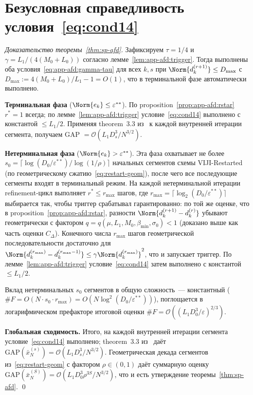 \section{Безусловная справедливость условия~\eqref{eq:cond14}}
\label{sec:app-afd:cond14}

\begin{proof}[Доказательство теоремы~\ref{thm:sp-afd}]
Зафиксируем $\tau = 1/4$ и $\gamma = L_1/(4(M_0 + L_0))$ согласно
лемме~\ref{lem:app-afd:trigger}. Тогда выполнены оба условия~\eqref{eq:app-afd:gamma-tau}
для всех $k, s$ при $\Norm{d^{(r+1)}_k} \le D_{\max}$ с
$D_{\max} := 4(M_0 + L_0)/L_1 - 1 = O(1)$, что в терминальной фазе
автоматически выполнено.

\textbf{Терминальная фаза} ($\Norm{e_k} \le \varepsilon^{**}$).
По proposition~\ref{prop:app-afd:rstar} $r^{*} = 1$ всегда; по
лемме~\ref{lem:app-afd:trigger} условие~\eqref{eq:cond14} выполнено
с константой $\le L_1/2$. Применяя theorem~3.3
из~\cite{Agafonov2024VIJI} к каждой внутренней итерации сегмента,
получаем GAP $= \mathcal O(L_1 D_s^{3} / N^{3/2})$.

\textbf{Нетерминальная фаза} ($\Norm{e_k} > \varepsilon^{**}$).
Эта фаза охватывает не более $s_0 = \lceil\log(D_0/\varepsilon^{**})/\log(1/\rho)\rceil$
начальных сегментов схемы VIJI-Restarted (по
геометрическому сжатию~\eqref{eq:restart-geom}), после чего все
последующие сегменты входят в терминальный режим. На каждой
нетерминальной итерации refinement-цикл выполняет $r^{*} \le
r_{\max}$ шагов, где $r_{\max} = \lceil\log_2(D_0/\varepsilon^{**})\rceil$
выбирается так, чтобы триггер срабатывал гарантированно: по той же
оценке, что в proposition~\ref{prop:app-afd:rstar}, разности
$\Norm{d^{(r+1)}_k - d^{(r)}_k}$ убывают геометрически с фактором
$q = q(\mu, L_1, M_0, \beta_{\min}, \sigma_0) < 1$ (доказано выше как
часть оценки $C_{\Delta}$). Конечного числа $r_{\max}$ шагов
геометрической последовательности достаточно для $\Norm{d^{(r_{\max})}_k -
d^{(r_{\max}-1)}_k} \le \gamma\Norm{d^{(r_{\max})}_k}^2$, что и
запускает триггер. По лемме~\ref{lem:app-afd:trigger}
условие~\eqref{eq:cond14} затем выполнено с константой $\le L_1/2$.

Вклад нетерминальных $s_0$ сегментов в общую сложность~--- константный
($\#F = O(N \cdot s_0 \cdot r_{\max}) = O(N \log^2(D_0/\varepsilon^{**}))$),
поглощается в логарифмическом префакторе итоговой оценки
$\#F = \mathcal O((L_1 D_0^3/\varepsilon)^{2/3})$.

\textbf{Глобальная сходимость.}
Итого, на каждой внутренней итерации сегмента условие~\eqref{eq:cond14}
выполнено; theorem~3.3 из~\cite{Agafonov2024VIJI} даёт
$\mathrm{GAP}(\bar x^{(s)}_N) = \mathcal O(L_1 D_s^{3}/N^{3/2})$.
Геометрическая декада сегментов из~\eqref{eq:restart-geom} с фактором
$\rho \in (0, 1)$ даёт суммарную оценку
$\mathrm{GAP}(\bar x^{(S)}_N) = \mathcal O(L_1 D_0^{3} \rho^{3S} / N^{3/2})$,
что и есть утверждение теоремы~\ref{thm:sp-afd}. \qed
\end{proof}

